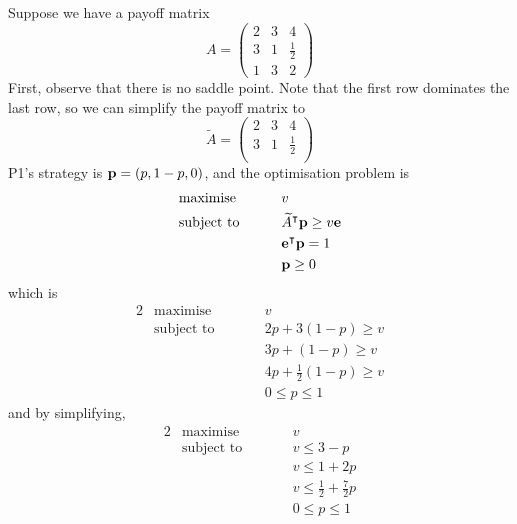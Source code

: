 \begin{example}
	Suppose we have a payoff matrix
	\[
		A = \begin{pmatrix}
			2 & 3 & 4           \\
			3 & 1 & \frac{1}{2} \\
			1 & 3 & 2
		\end{pmatrix}
	\]
	First, observe that there is no saddle point.
	Note that the first row dominates the last row, so we can simplify the payoff matrix to
	\[
		\widetilde{A} = \begin{pmatrix}
			2 & 3 & 4           \\
			3 & 1 & \frac{1}{2} \\
		\end{pmatrix}
	\]
	P1's strategy is \( \vb p = (p, 1-p, 0) \), and the optimisation problem is
	\begin{alignat*}{2}
		 & \text{maximise}   & \qquad & v                                           \\
		 & \text{subject to} &        & \widetilde{A}^\intercal \vb p \geq v \vb e \\
		 &                   &        & \vb e^\intercal \vb p = 1                  \\
		 &                   &        & \vb p \geq 0
	\end{alignat*}
	which is
	\begin{alignat*}{2}
		 & \text{maximise}   & \qquad & v                            \\
		 & \text{subject to} &        & 2p + 3(1-p) \geq v           \\
		 &                   &        & 3p + (1-p) \geq v            \\
		 &                   &        & 4p + \frac{1}{2}(1-p) \geq v \\
		 &                   &        & 0 \leq p \leq 1
	\end{alignat*}
	and by simplifying,
	\begin{alignat*}{2}
		 & \text{maximise}   & \qquad & v                                 \\
		 & \text{subject to} &        & v \leq 3 - p                      \\
		 &                   &        & v \leq 1 + 2p                     \\
		 &                   &        & v \leq \frac{1}{2} + \frac{7}{2}p \\
		 &                   &        & 0 \leq p \leq 1
	\end{alignat*}

\end{example}
